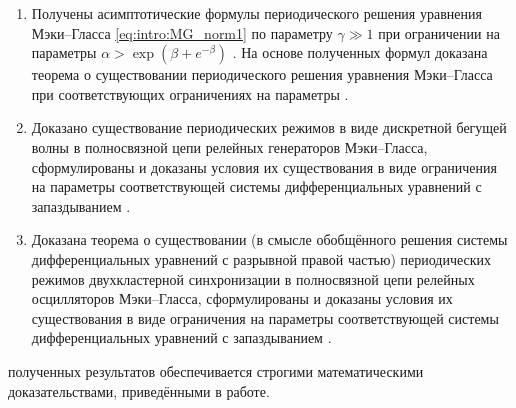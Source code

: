 {}
\begin{enumerate}[beginpenalty=10000] %
	\item Получены асимптотические формулы периодического решения уравнения Мэки--Гласса \eqref{eq:intro:MG_norm1} по параметру $\gamma \gg 1$ при ограничении на параметры $\alpha > \exp(\beta + e^{-\beta})$ \cite[Теорема 5.6]{wosbib1}. На основе полученных формул доказана теорема о существовании периодического решения уравнения Мэки--Гласса при соответствующих ограничениях на параметры \cite[Теорема 3.2]{wosbib1}.
	\item Доказано существование периодических режимов в виде дискретной бегущей волны в полносвязной цепи релейных генераторов Мэки--Гласса, сформулированы и доказаны условия их существования в виде ограничения на параметры соответствующей системы дифференциальных уравнений с запаздыванием \cite[Теорема 16]{wosbib2}.
	\item Доказана теорема о существовании (в смысле обобщённого решения системы дифференциальных уравнений с разрывной правой частью) периодических режимов двухкластерной синхронизации в полносвязной цепи релейных осцилляторов Мэки--Гласса, сформулированы и доказаны условия их существования в виде ограничения на параметры соответствующей системы дифференциальных уравнений с запаздыванием \cite[Теорема 5.2]{scbib1}.
\end{enumerate}


{\reliability} полученных результатов обеспечивается строгими математическими доказательствами, приведёнными в работе. %

\nocite{scbib1, wosbib1, wosbib2}

